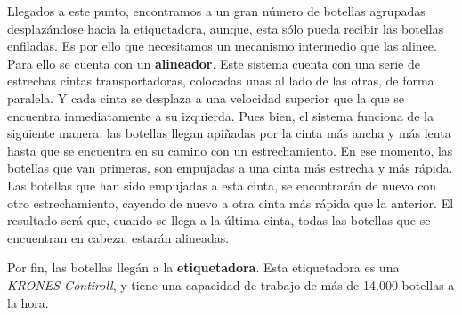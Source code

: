 \documentclass[11pt,a4paper,spanish,twoside]{report}
\begin{document}
Llegados a este punto, encontramos a un gran número de botellas agrupadas 
desplazándose hacia la etiquetadora, aunque, esta sólo pueda recibir las 
botellas enfiladas. Es por ello que necesitamos un mecanismo intermedio que 
las alinee. Para ello se cuenta con un \textbf{alineador}. Este sistema cuenta
con una serie de estrechas cintas transportadoras, colocadas unas al lado de
las otras, de forma paralela. Y cada cinta se desplaza a una velocidad 
superior que la que se encuentra inmediatamente a su izquierda. Pues bien, el
sistema funciona de la siguiente manera: las botellas llegan apiñadas por la 
cinta más ancha y más lenta hasta que se encuentra en su camino con un 
estrechamiento. En ese momento, las botellas que van primeras, son empujadas
a una cinta más estrecha y más rápida. Las botellas que han sido empujadas a
esta cinta, se encontrarán de nuevo con otro estrechamiento, cayendo de nuevo
a otra cinta más rápida que la anterior. El resultado será que, cuando se 
llega a la última cinta, todas las botellas que se encuentran en cabeza, 
estarán alineadas.

Por fin, las botellas llegán a la \textbf{etiquetadora}. Esta etiquetadora es 
una \emph{KRONES Contiroll}, y tiene una capacidad de trabajo de más de 14.000 
botellas a la hora.
\end{document}
